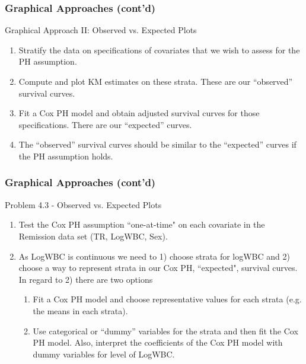\documentclass{beamer}
\theoremstyle{definition}
\begin{document}
\begin{frame}
\frametitle{Graphical Approaches (cont'd)}
\begin{block}{Graphical Approach II: Observed vs. Expected Plots}
\begin{enumerate}
\item Stratify the data on specifications of covariates that we wish to assess for the PH assumption.
\item Compute and plot KM estimates on these strata. These are our ``observed'' survival curves.
\item Fit a Cox PH model and obtain adjusted survival curves for those specifications. There are our ``expected'' curves.
\item The ``observed'' survival curves should be similar to the ``expected'' curves if the PH assumption holds.
\end{enumerate}
\end{block}
\end{frame}

\begin{frame}
\frametitle{Graphical Approaches (cont'd)}
\begin{block}{Problem 4.3 - Observed vs. Expected Plots}
\begin{enumerate}
\item Test the Cox PH assumption ``one-at-time" on each covariate in the Remission data set (TR, LogWBC, Sex).
\item As LogWBC is continuous we need to 1) choose strata for logWBC and 2) choose a way to represent strata in our Cox PH, ``expected", survival curves. In regard to 2) there are two options
\begin{enumerate}
\item Fit a Cox PH model and choose representative values for each strata (e.g. the means in each strata).
\item Use categorical or ``dummy'' variables for the strata and then fit the Cox PH model. Also, interpret the coefficients of the Cox PH model with dummy variables for level of LogWBC.
\end{enumerate}
\end{enumerate}
\end{block}
\end{frame}
\end{document}

